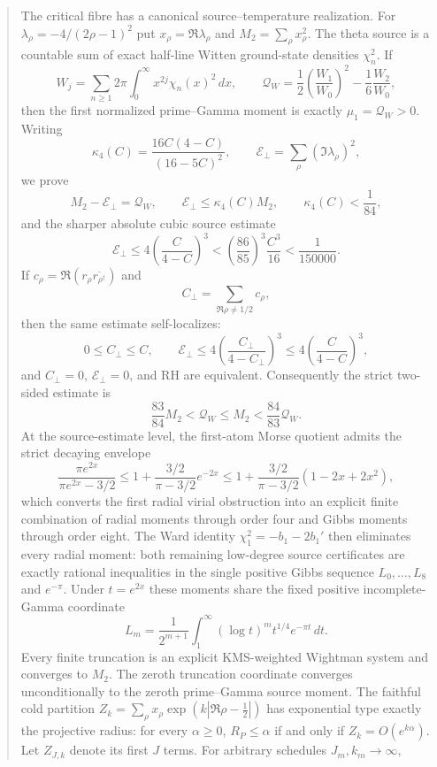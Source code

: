 \documentclass[11pt]{article}
\begin{document}
\begin{abstract}
The critical fibre has a canonical source--temperature realization.  For
$\lambda_\rho=-4/(2\rho-1)^2$ put $x_\rho=\Re\lambda_\rho$ and
$M_2=\sum_\rho x_\rho^2$.  The theta source is a countable sum of exact half-line Witten
ground-state densities $\chi_n^2$.  If
\[
 W_j=\sum_{n\ge1}2\pi\int_0^\infty x^{2j}\chi_n(x)^2\,dx,
 \qquad
 \mathcal Q_W=\frac12\left(\frac{W_1}{W_0}\right)^2
              -\frac16\frac{W_2}{W_0},
\]
then the first normalized prime--Gamma moment is exactly $\mu_1=\mathcal Q_W>0$.  Writing
\[
 \kappa_4(C)=\frac{16C(4-C)}{(16-5C)^2},
 \qquad
 \mathcal E_\perp=\sum_\rho(\Im\lambda_\rho)^2,
\]
we prove
\[
 M_2-\mathcal E_\perp=\mathcal Q_W,
 \qquad \mathcal E_\perp\le\kappa_4(C)M_2,
 \qquad \kappa_4(C)<\frac1{84},
\]
and the sharper absolute cubic source estimate
\[
 \mathcal E_\perp
 \le4\left(\frac{C}{4-C}\right)^3
 <\left(\frac{86}{85}\right)^3\frac{C^3}{16}
 <\frac1{150000}.
\]
If \(c_\rho=\Re(r_\rho\overline{r_{\rho^\dagger}})\) and
\[
 C_\perp=\sum_{\Re\rho\ne1/2}c_\rho,
\]
then the same estimate self-localizes:
\[
 0\le C_\perp\le C,\qquad
 \mathcal E_\perp\le
 4\left(\frac{C_\perp}{4-C_\perp}\right)^3
 \le4\left(\frac{C}{4-C}\right)^3,
\]
and \(C_\perp=0\), \(\mathcal E_\perp=0\), and RH are equivalent.
Consequently the strict two-sided estimate is
\[
 \frac{83}{84}M_2<\mathcal Q_W\le M_2
 <\frac{84}{83}\mathcal Q_W.
\]
At the source-estimate level, the first-atom Morse quotient admits the strict decaying envelope
\[
 \frac{\pi e^{2x}}{\pi e^{2x}-3/2}
 \le1+\frac{3/2}{\pi-3/2}e^{-2x}
 \le1+\frac{3/2}{\pi-3/2}(1-2x+2x^2),
\]
which converts the first radial virial obstruction into an explicit finite combination of radial
moments through order four and Gibbs moments through order eight.  The Ward identity
$\chi_1^2=-b_1-2b_1'$ then eliminates every radial moment: both remaining low-degree source
certificates are exactly rational inequalities in the single positive Gibbs sequence
$L_0,\ldots,L_8$ and $e^{-\pi}$.  Under $t=e^{2x}$ these moments share the fixed positive
incomplete-Gamma coordinate
\[
 L_m=\frac1{2^{m+1}}
 \int_1^\infty(\log t)^m t^{1/4}e^{-\pi t}\,dt.
\]
Every finite truncation is an explicit KMS-weighted Wightman system and converges to $M_2$.
The zeroth truncation coordinate converges unconditionally to the zeroth prime--Gamma source
moment.  The faithful cold partition
$Z_k=\sum_\rho x_\rho\exp(k|\Re\rho-\frac12|)$ has exponential type exactly the projective
radius: for every $\alpha\ge0$, $R_P\le\alpha$ if and only if
$Z_k=O(e^{k\alpha})$.  Let \(Z_{J,k}\) denote its first \(J\) terms.  For arbitrary schedules
$J_m,k_m\to\infty$,

\end{abstract}
\end{document}
